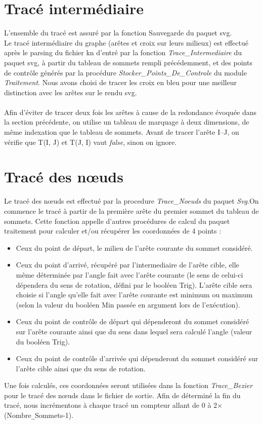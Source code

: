 \documentclass[12pt]{article}
\begin{document}
\section {Tracé intermédiaire}
L'ensemble du tracé est assuré par la fonction Sauvegarde du paquet svg.
\\
Le tracé intermédiaire du graphe (arêtes et croix sur leurs milieux) est effectué après le parsing du fichier kn d'entré par la fonction
\emph{Trace\_Intermediaire} du paquet svg, à partir du tableau de
sommets rempli précédemment, et des points de contrôle générés par la
procédure \emph{Stocker\_Points\_De\_Controle} du module
\emph{Traitement}. 
Nous avons choisi de tracer les croix en bleu pour une meilleur
distinction avec les arêtes sur le rendu svg.\\
\\
Afin d'éviter de tracer deux fois les arêtes à cause de la redondance
évoquée dans la section précédente, on utilise un tableau de marquage à deux
dimensions, de même indexation que le tableau de sommets. Avant de
tracer l'arête I--J, on vérifie que T(I, J) et T(J, I) vaut \emph{false},
sinon on ignore.
\section {Tracé des nœuds}
Le tracé des nœuds est effectué par la procedure \emph{Trace\_Noeuds} du
paquet \emph{Svg}.On commence le tracé à partir de la première arête du premier sommet du tableau de sommets. Cette fonction appelle d'autres procédures de calcul du paquet traitement pour calculer et/ou récupérer les coordonnées de 4 points :
\begin{itemize}
\item Ceux du point de départ, le milieu de l'arête courante du sommet considéré.
\item Ceux du point d'arrivé, récupéré par l'intermediaire de l'arête cible, elle même déterminée par l'angle fait avec l'arête courante (le sens de celui-ci dépendera du sens de rotation, défini par le booléen Trig). L'arête cible sera choisie si l'angle qu'elle fait avec l'arête courante est minimum ou maximum (selon la valeur du booléen Min passée en argument lors de l'exécution).
\item Ceux du point de contrôle de départ qui dépenderont du sommet considéré sur l'arête courante ainsi que du sens dans lequel sera calculé l'angle (valeur du booléen Trig).
\item Ceux du point de contrôle d'arrivée qui dépenderont du sommet considéré sur l'arête cible ainsi que du sens de rotation.
\end{itemize}
Une fois calculés, ces coordonnées seront utilisées dans la fonction
\emph{Trace\_Bezier} pour le tracé des nœuds dans le fichier de sortie. 
Afin de déterminé la fin du tracé, nous incrémentons à chaque tracé un
compteur allant de 0 à 2$\times$(Nombre\verb+_+Sommets-1). 
\end{document}
